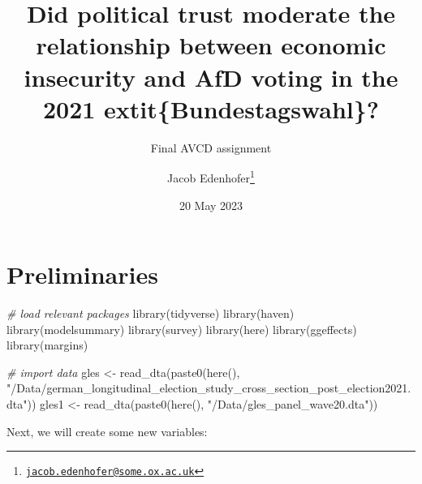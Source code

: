 \documentclass[
]{article}
\title{Did political trust moderate the relationship between economic
insecurity and AfD voting in the 2021 extit\{Bundestagswahl\}?}
\subtitle{Final AVCD assignment}
\author{Jacob Edenhofer\footnote{\href{mailto:jacob.edenhofer@some.ox.ac.uk}{\nolinkurl{jacob.edenhofer@some.ox.ac.uk}}}}
\date{20 May 2023}
\newenvironment{Shaded}{\begin{snugshade}}{\end{snugshade}}
\newcommand{\CommentTok}[1]{\textcolor[rgb]{0.56,0.35,0.01}{\textit{#1}}}
\newcommand{\FunctionTok}[1]{\textcolor[rgb]{0.00,0.00,0.00}{#1}}
\newcommand{\NormalTok}[1]{#1}
\newcommand{\OtherTok}[1]{\textcolor[rgb]{0.56,0.35,0.01}{#1}}
\newcommand{\StringTok}[1]{\textcolor[rgb]{0.31,0.60,0.02}{#1}}
\begin{document}
\maketitle

\hypertarget{preliminaries}{%
\section{Preliminaries}\label{preliminaries}}

\begin{Shaded}
\begin{Highlighting}[]
\CommentTok{\# load relevant packages }
\FunctionTok{library}\NormalTok{(tidyverse)}
\FunctionTok{library}\NormalTok{(haven)}
\FunctionTok{library}\NormalTok{(modelsummary)}
\FunctionTok{library}\NormalTok{(survey)}
\FunctionTok{library}\NormalTok{(here)}
\FunctionTok{library}\NormalTok{(ggeffects)}
\FunctionTok{library}\NormalTok{(margins)}

\CommentTok{\# import data }
\NormalTok{gles }\OtherTok{\textless{}{-}} \FunctionTok{read\_dta}\NormalTok{(}\FunctionTok{paste0}\NormalTok{(}\FunctionTok{here}\NormalTok{(), }\StringTok{"/Data/german\_longitudinal\_election\_study\_cross\_section\_post\_election2021.dta"}\NormalTok{))}
\NormalTok{gles1 }\OtherTok{\textless{}{-}} \FunctionTok{read\_dta}\NormalTok{(}\FunctionTok{paste0}\NormalTok{(}\FunctionTok{here}\NormalTok{(), }\StringTok{"/Data/gles\_panel\_wave20.dta"}\NormalTok{))}
\end{Highlighting}
\end{Shaded}

Next, we will create some new variables:
\end{document}
